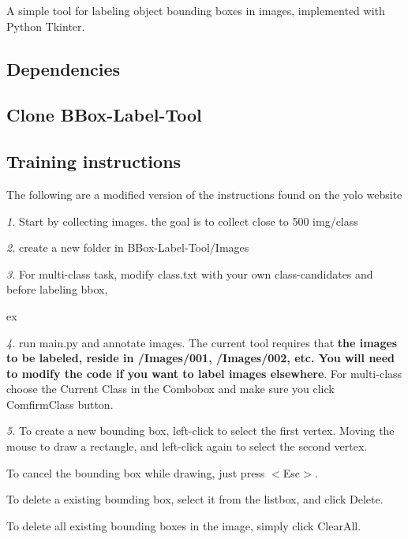 A simple tool for labeling object bounding boxes in images, implemented with Python Tkinter.

\subsection*{Dependencies}


\begin{DoxyCode}{0}
\end{DoxyCode}
 \subsection*{Clone B\+Box-\/\+Label-\/\+Tool}


\begin{DoxyCode}{0}
\end{DoxyCode}


\subsection*{Training instructions}

The following are a modified version of the instructions found on the yolo website

{\itshape 1.} Start by collecting images. the goal is to collect close to 500 img/class

{\itshape 2.} create a new folder in B\+Box-\/\+Label-\/\+Tool/\+Images

{\itshape 3.} For multi-\/class task, modify \textquotesingle{}class.\+txt\textquotesingle{} with your own class-\/candidates and before labeling bbox,

ex 
\begin{DoxyCode}{0}
\end{DoxyCode}


{\itshape 4.} run main.\+py and annotate images. The current tool requires that {\bfseries{the images to be labeled, reside in /\+Images/001, /\+Images/002, etc. You will need to modify the code if you want to label images elsewhere}}. For multi-\/class choose the \textquotesingle{}Current Class\textquotesingle{} in the Combobox and make sure you click \textquotesingle{}Comfirm\+Class\textquotesingle{} button.

{\itshape 5.} To create a new bounding box, left-\/click to select the first vertex. Moving the mouse to draw a rectangle, and left-\/click again to select the second vertex.
\begin{DoxyItemize}
\item To cancel the bounding box while drawing, just press {\ttfamily $<$Esc$>$}.
\item To delete a existing bounding box, select it from the listbox, and click {\ttfamily Delete}.
\item To delete all existing bounding boxes in the image, simply click {\ttfamily Clear\+All}.
\end{DoxyItemize}

